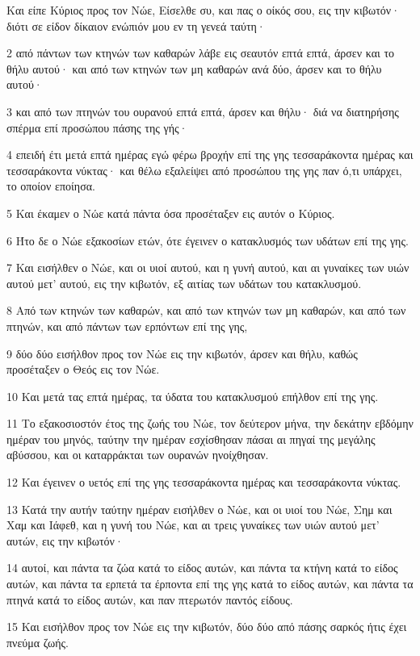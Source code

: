 \par Και είπε Κύριος προς τον Νώε, Είσελθε συ, και πας ο οίκός σου, εις την κιβωτόν· διότι σε είδον δίκαιον ενώπιόν μου εν τη γενεά ταύτη·
\par 2 από πάντων των κτηνών των καθαρών λάβε εις σεαυτόν επτά επτά, άρσεν και το θήλυ αυτού· και από των κτηνών των μη καθαρών ανά δύο, άρσεν και το θήλυ αυτού·
\par 3 και από των πτηνών του ουρανού επτά επτά, άρσεν και θήλυ· διά να διατηρήσης σπέρμα επί προσώπου πάσης της γής·
\par 4 επειδή έτι μετά επτά ημέρας εγώ φέρω βροχήν επί της γης τεσσαράκοντα ημέρας και τεσσαράκοντα νύκτας· και θέλω εξαλείψει από προσώπου της γης παν ό,τι υπάρχει, το οποίον εποίησα.
\par 5 Και έκαμεν ο Νώε κατά πάντα όσα προσέταξεν εις αυτόν ο Κύριος.
\par 6 Ήτο δε ο Νώε εξακοσίων ετών, ότε έγεινεν ο κατακλυσμός των υδάτων επί της γης.
\par 7 Και εισήλθεν ο Νώε, και οι υιοί αυτού, και η γυνή αυτού, και αι γυναίκες των υιών αυτού μετ' αυτού, εις την κιβωτόν, εξ αιτίας των υδάτων του κατακλυσμού.
\par 8 Από των κτηνών των καθαρών, και από των κτηνών των μη καθαρών, και από των πτηνών, και από πάντων των ερπόντων επί της γης,
\par 9 δύο δύο εισήλθον προς τον Νώε εις την κιβωτόν, άρσεν και θήλυ, καθώς προσέταξεν ο Θεός εις τον Νώε.
\par 10 Και μετά τας επτά ημέρας, τα ύδατα του κατακλυσμού επήλθον επί της γης.
\par 11 Το εξακοσιοστόν έτος της ζωής του Νώε, τον δεύτερον μήνα, την δεκάτην εβδόμην ημέραν του μηνός, ταύτην την ημέραν εσχίσθησαν πάσαι αι πηγαί της μεγάλης αβύσσου, και οι καταρράκται των ουρανών ηνοίχθησαν.
\par 12 Και έγεινεν ο υετός επί της γης τεσσαράκοντα ημέρας και τεσσαράκοντα νύκτας.
\par 13 Κατά την αυτήν ταύτην ημέραν εισήλθεν ο Νώε, και οι υιοί του Νώε, Σημ και Χαμ και Ιάφεθ, και η γυνή του Νώε, και αι τρεις γυναίκες των υιών αυτού μετ' αυτών, εις την κιβωτόν·
\par 14 αυτοί, και πάντα τα ζώα κατά το είδος αυτών, και πάντα τα κτήνη κατά το είδος αυτών, και πάντα τα ερπετά τα έρποντα επί της γης κατά το είδος αυτών, και πάντα τα πτηνά κατά το είδος αυτών, και παν πτερωτόν παντός είδους.
\par 15 Και εισήλθον προς τον Νώε εις την κιβωτόν, δύο δύο από πάσης σαρκός ήτις έχει πνεύμα ζωής.
